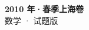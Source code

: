\documentclass[zihao=-4, a4paper]{ctexart}
\begin{document}
\begin{center}
  {\Large\bfseries 2010 年·春季上海卷}\\[4pt]
  {\large 数学 · 试题版}
\end{center}
\medskip
{}

\end{document}
